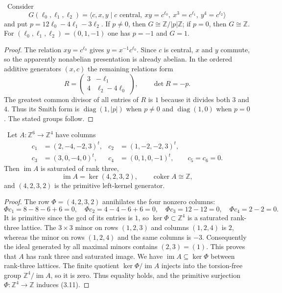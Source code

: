 \begin{proposition}
\label{wb:prop:terminal-group}
\ Consider
\[
G(\ell_0,\ell_1,\ell_2)=
\langle c,x,y\mid c\text{ central},\
xy=c^{\ell_0},\ x^3=c^{\ell_1},\ y^4=c^{\ell_2}\rangle
\]
and put $p=12\ell_0-4\ell_1-3\ell_2$.  If $p\ne0$, then
$G\cong\mathbb Z/|p|\mathbb Z$; if $p=0$, then $G\cong\mathbb Z$.
For $(\ell_0,\ell_1,\ell_2)=(0,1,-1)$ one has $p=-1$ and $G=1$.
\end{proposition}

\begin{proof}
The relation $xy=c^{\ell_0}$ gives $y=x^{-1}c^{\ell_0}$.  Since $c$ is
central, $x$ and $y$ commute, so the apparently nonabelian presentation is
already abelian.  In the ordered additive generators $(x,c)$ the remaining
relations form
\[
R=\begin{pmatrix}3&-\ell_1\\4&\ell_2-4\ell_0\end{pmatrix},
\qquad \det R=-p.
\]
The greatest common divisor of all entries of $R$ is $1$ because it divides
both $3$ and $4$.  Thus its Smith form is
$\operatorname{diag}(1,|p|)$ when $p\ne0$ and
$\operatorname{diag}(1,0)$ when $p=0$.  The stated groups follow.
\end{proof}

\begin{proposition}
\label{wb:prop:terminal-degree-two}
\ Let $A:\mathbb Z^6\to\mathbb Z^4$ have columns
\[
\begin{aligned}
c_1&=(2,-4,-2,3)^t,&c_2&=(1,-2,-2,3)^t,\\
c_3&=(3,0,-4,0)^t,&c_4&=(0,1,0,-1)^t,
\qquad c_5=c_6=0.
\end{aligned}
\]
Then $\operatorname{im}A$ is saturated of rank three,
\[
\operatorname{im}A=\ker(4,2,3,2),
\qquad
\operatorname{coker}A\cong\mathbb Z,
\tag{3.11}
\]
and $(4,2,3,2)$ is the primitive left-kernel generator.
\end{proposition}

\begin{proof}
The row $\Phi=(4,2,3,2)$ annihilates the four nonzero columns:
\[
\Phi c_1=8-8-6+6=0,\quad
\Phi c_2=4-4-6+6=0,\quad
\Phi c_3=12-12=0,\quad
\Phi c_4=2-2=0.
\]
It is primitive since the gcd of its entries is $1$, so
$\ker\Phi\subset\mathbb Z^4$ is a saturated rank-three lattice.
The $3\times3$ minor on rows $(1,2,3)$ and columns $(1,2,4)$ is $2$,
whereas the minor on rows $(1,2,4)$ and the same columns is $-3$.
Consequently the ideal generated by all maximal minors contains $(2,3)=(1)$.
This proves that $A$ has rank three and saturated image.  We have
$\operatorname{im}A\subseteq\ker\Phi$ between rank-three lattices.
The finite quotient $\ker\Phi/\operatorname{im}A$ injects into the
torsion-free group $\mathbb Z^4/\operatorname{im}A$, so it is zero.
Thus equality holds, and the primitive surjection $\Phi:\mathbb Z^4\to
\mathbb Z$ induces (3.11).
\end{proof}

